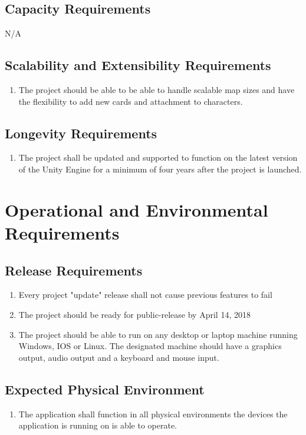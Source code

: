 \documentclass{article}
\begin{document}
\subsection{Capacity Requirements}
\quad N/A
\subsection{Scalability and Extensibility Requirements}
\begin{enumerate}[{SER}1. ]
	\item The project should be able to be able to handle scalable map sizes and have the flexibility to add new cards and attachment to characters.
\end{enumerate}
\subsection{Longevity Requirements}
\begin{enumerate}[{LR}1. ]
	\item The project shall be updated and supported to function on the latest version of the Unity Engine for a minimum of four years after the project is launched.
\end{enumerate}
\section{Operational and Environmental Requirements}
\subsection{Release Requirements}
\begin{enumerate}[{RR}1. ]
	\item Every project "update" release shall not cause previous features to fail
	\item The project should be ready for public-release by April  14, 2018
	\item The project should be able to run on any desktop or laptop machine running Windows, IOS or Linux. The designated machine should have a graphics output, audio output and a keyboard and mouse input.
\end{enumerate}
\subsection{Expected Physical Environment}
\begin{enumerate}[{EPE}1. ]
	\item The application shall function in all physical environments the devices the application is running on is able to operate.
\end{enumerate}
\end{document}
